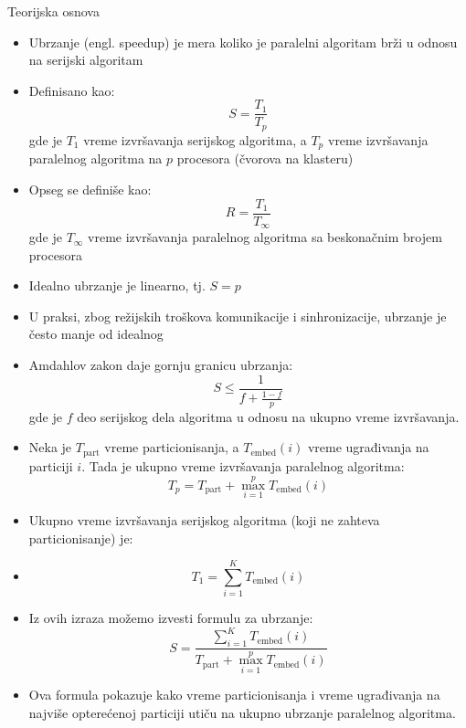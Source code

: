 \documentclass{beamer}
\begin{document}
\begin{frame}{Teorijska osnova}
\begin{itemize}
    \item Ubrzanje (engl. speedup) je mera koliko je paralelni algoritam brži u odnosu na serijski algoritam
    \item Definisano kao:
    $$ S = \frac{T_1}{T_p} $$
    gde je $ T_1 $ vreme izvršavanja serijskog algoritma, a $ T_p $ vreme izvršavanja paralelnog algoritma na $ p $ procesora (čvorova na klasteru)
    \item Opseg se definiše kao:
    $$ R = \frac{T_1}{T_\infty} $$
    gde je $ T_\infty $ vreme izvršavanja paralelnog algoritma sa beskonačnim brojem procesora
    \item Idealno ubrzanje je linearno, tj. $ S = p $
    \item U praksi, zbog režijskih troškova komunikacije i sinhronizacije, ubrzanje je često manje od idealnog
\end{itemize}
\end{frame}

\begin{frame}
\begin{itemize}
    \item Amdahlov zakon daje gornju granicu ubrzanja:
    $$ S \leq \frac{1}{f + \frac{1-f}{p}} $$
    gde je $ f $ deo serijskog dela algoritma u odnosu na ukupno vreme izvršavanja.
    \item Neka je $T_{\text{part}}$ vreme particionisanja, a $T_{\text{embed}}(i)$ vreme ugrađivanja na particiji $i$. Tada je ukupno vreme izvršavanja paralelnog algoritma:
    $$ T_p = T_{\text{part}} + \max_{i=1}^{p} T_{\text{embed}}(i) $$
    \item Ukupno vreme izvršavanja serijskog algoritma (koji ne zahteva particionisanje) je:
    \item $$ T_1 = \sum_{i=1}^{K} T_{\text{embed}}(i) $$
\end{itemize}    
\end{frame}

\begin{frame}
\begin{itemize}
    \item Iz ovih izraza možemo izvesti formulu za ubrzanje:
    $$ S = \frac{\sum_{i=1}^{K} T_{\text{embed}}(i)}{T_{\text{part}} + \max_{i=1}^{p} T_{\text{embed}}(i)} $$
    \item Ova formula pokazuje kako vreme particionisanja i vreme ugrađivanja na najviše opterećenoj particiji utiču na ukupno ubrzanje paralelnog algoritma.
\end{itemize}
\end{frame}
\end{document}
